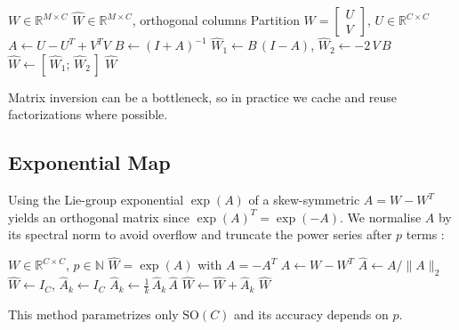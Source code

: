 \begin{algorithm}[H]
\begin{algorithmic}[1]
\Require \(W\in\mathbb{R}^{M\times C}\)
\Ensure \(\hat W\in\mathbb{R}^{M\times C}\), orthogonal columns
    \State Partition \(W = \begin{bmatrix}U\\V\end{bmatrix}\), \(U\in\mathbb{R}^{C\times C}\)
    \State \(A \gets U - U^T + V^T V\) 
    \State \(B \gets (I + A)^{-1}\)
    \State \(\hat W_1 \gets B\,(I - A)\), \(\hat W_2 \gets -2\,V\,B\)
    \State \(\hat W \gets [\,\hat W_1;\,\hat W_2\,]\)
    \State \Return \(\hat W\)
\EndProcedure
\end{algorithmic}
\caption{Augmented Cayley Transform}
\label{alg:cayley}
\end{algorithm}

Matrix inversion can be a bottleneck, so in practice we cache and reuse factorizations where possible.

\subsection{Exponential Map}

Using the Lie-group exponential \(\exp(A)\) of a skew-symmetric \(A=W-W^T\) yields an orthogonal matrix since \(\exp(A)^T = \exp(-A)\).  We normalise \(A\) by its spectral norm to avoid overflow and truncate the power series after \(p\) terms \cite{singla_skew_2021}:

\begin{algorithm}[H]
\begin{algorithmic}[1]
\Require \(W\in\mathbb{R}^{C\times C}\), \(p\in\mathbb{N}\)
\Ensure \(\hat W = \exp(A)\) with \(A=-A^T\)
    \State \(A \gets W - W^T\)
    \State \(\hat A \gets A / \|A\|_2\) 
    \State \(\hat W \gets I_C\), \(\hat A_k \gets I_C\)
        \State \(\hat A_k \gets \frac1k\,\hat A_k\,\hat A\)
        \State \(\hat W \gets \hat W + \hat A_k\)
    \EndFor
    \State \Return \(\hat W\)
\EndProcedure
\end{algorithmic}
\caption{Exponential Map with Spectral Normalization}
\label{alg:EXP}
\end{algorithm}

This method parametrizes only \(\mathrm{SO}(C)\) and its accuracy depends on \(p\).


